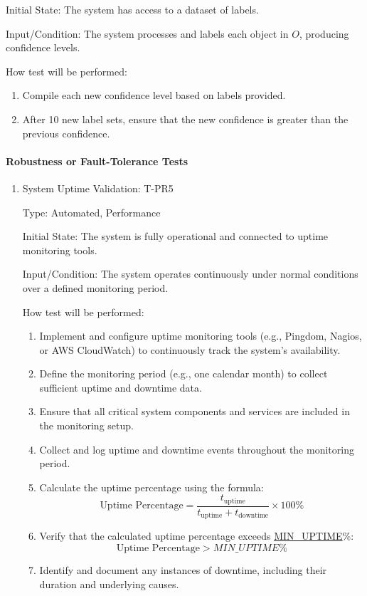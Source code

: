 \documentclass[12pt, titlepage]{article}
\begin{document}
\begin{enumerate}
Initial State: The system has access to a dataset of labels.

Input/Condition: The system processes and labels each object in \( O \), producing confidence levels.

How test will be performed:
\begin{enumerate}
    \item Compile each new confidence level based on labels provided.
    \item After 10 new label sets, ensure that the new confidence is greater than the previous confidence.
\end{enumerate}


\end{enumerate}

\paragraph{Robustness or Fault-Tolerance Tests}
\begin{enumerate}

\item{System Uptime Validation: T-PR5\\}

Type: Automated, Performance

Initial State: The system is fully operational and connected to uptime monitoring tools.

Input/Condition: The system operates continuously under normal conditions over a defined monitoring period.

How test will be performed:
\begin{enumerate}
    \item Implement and configure uptime monitoring tools (e.g., Pingdom, Nagios, or AWS CloudWatch) to continuously track the system's availability.
    \item Define the monitoring period (e.g., one calendar month) to collect sufficient uptime and downtime data.
    \item Ensure that all critical system components and services are included in the monitoring setup.
    \item Collect and log uptime and downtime events throughout the monitoring period.
    \item Calculate the uptime percentage using the formula:
    \[
    \text{Uptime Percentage} = \frac{t_{\text{uptime}}}{t_{\text{uptime}} + t_{\text{downtime}}} \times 100\%
    \]
    \item Verify that the calculated uptime percentage exceeds \hyperref[MIN_UPTIME]{MIN\_UPTIME}\%:
    \[
    \text{Uptime Percentage} > \hyperref[MIN_UPTIME]{MIN\_UPTIME}\%
    \]
    \item Identify and document any instances of downtime, including their duration and underlying causes.
\end{enumerate}

\end{enumerate}
\end{document}
